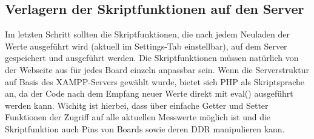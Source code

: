 \subsection{Verlagern der Skriptfunktionen auf den Server}
Im letzten Schritt sollten die Skriptfunktionen, die nach jedem Neuladen der
Werte ausgeführt wird (aktuell im Settings-Tab einstellbar), auf dem Server
gespeichert und ausgeführt werden. Die Skriptfunktionen müssen natürlich von der
Webseite aus für jedes Board einzeln anpassbar sein. 
Wenn die Serverstruktur auf Basis des
XAMPP-Servers gewählt wurde, bietet sich PHP als Skriptsprache an, da der Code
nach dem Empfang neuer Werte direkt mit \textrm{eval()} ausgeführt werden kann.
Wichitg ist hierbei, dass über einfache Getter und Setter Funktionen der Zugriff
auf alle aktuellen Messwerte möglich ist und die Skriptfunktion auch Pins von
Boards sowie deren DDR manipulieren kann.
